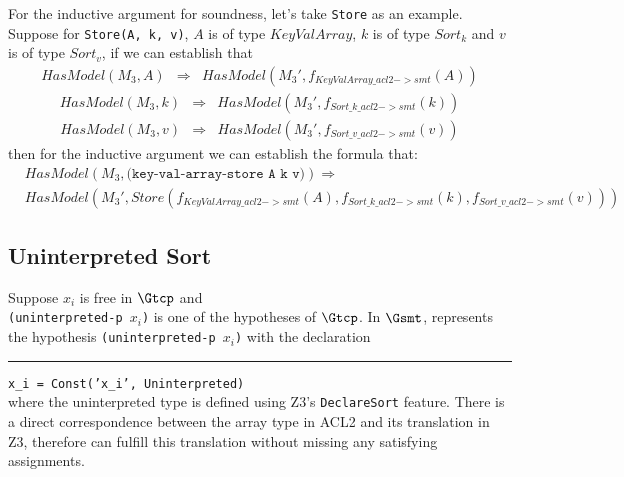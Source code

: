 For the inductive argument for soundness, let's take \texttt{Store} as an
example. Suppose for \texttt{Store(A, k, v)}, $A$ is of type $KeyValArray$, $k$
is of type $Sort_{k}$ and $v$ is of type $Sort_{v}$, if we can establish that
\begin{equation}\label{eq:arraystorebase1}\begin{array}{rcl}
HasModel(M_3, A) &\Rightarrow& HasModel(M_3', f_{KeyValArray\_acl2->smt}(A))
\end{array}\end{equation}
\begin{equation}\label{eq:arraystorebase2}\begin{array}{rcl}
HasModel(M_3, k) &\Rightarrow& HasModel(M_3', f_{Sort\_k\_acl2->smt}(k))
\end{array}\end{equation}
\begin{equation}\label{eq:arraystorebase3}\begin{array}{rcl}
HasModel(M_3, v) &\Rightarrow& HasModel(M_3', f_{Sort\_v\_acl2->smt}(v))
\end{array}\end{equation}                                         
then for the inductive argument we can establish the formula that:
\begin{equation}\label{eq:arraystoreinductive}\begin{array}{rcl}
&HasModel(M_3, \texttt{(key-val-array-store A k v)}) \Rightarrow \\
&HasModel(M_3', Store(f_{KeyValArray\_acl2->smt}(A), f_{Sort\_k\_acl2->smt}(k), f_{Sort\_v\_acl2->smt}(v)))
\end{array}\end{equation}

\subsection{Uninterpreted Sort}\label{subsec:soundunintertype}
Suppose  $x_i$ is free in $\Gtcp$ and \\
\texttt{(uninterpreted-p $x_i$)} is one of
the hypotheses of $\Gtcp$. In $\Gsmt$, \smtlink{} represents the hypothesis
\texttt{(uninterpreted-p $x_i$)} with the declaration\\
\rule{2em}{0ex}\texttt{x\_i = Const('x\_i', Uninterpreted)}\\
where the uninterpreted type is defined using Z3's \texttt{DeclareSort} feature.
There is a direct correspondence between the array type in ACL2 and its
translation in Z3, therefore \smtlink{} can fulfill this translation without
missing any satisfying assignments.

